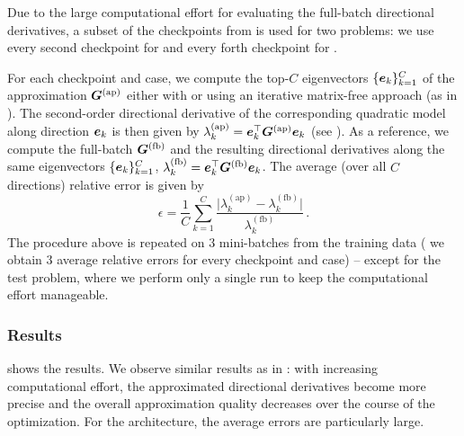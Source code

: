 Due to the large computational effort for evaluating the full-batch directional
derivatives, a subset of the checkpoints from 
is used for two problems: we use every second checkpoint for \cifarten
\resnetthirtytwo and every forth checkpoint for \cifarhun \allcnnc.

For each checkpoint and case, we compute the top-$C$ eigenvectors
$\{{\bm{e}}_k\}_{k=1}^C$ of the \ggn approximation ${\bm{G}}^{(\text{ap})}$ either with
\vivit or using an iterative matrix-free approach (as in
). The second-order directional derivative of the
corresponding quadratic model along direction ${\bm{e}}_k$ is then given by
$\lambda_k^{(\text{ap})} = {\bm{e}}_k^\top {\bm{G}}^{(\text{ap})} {\bm{e}}_k$ (see
). As a reference, we compute the full-batch
\ggn ${\bm{G}}^{(\text{fb})}$ and the resulting directional derivatives along the
same eigenvectors $\{{\bm{e}}_k\}_{k=1}^C$, \ie $\lambda_k^{(\text{fb})} =
{\bm{e}}_k^\top {\bm{G}}^{(\text{fb})} {\bm{e}}_k$. The average (over all $C$ directions)
relative error is given by
\begin{equation*}
  \epsilon = \frac{1}{C} \sum_{k=1}^C \frac{
    \lvert \lambda_k^{(\text{ap})} - \lambda_k^{(\text{fb})} \rvert
  }{\lambda_k^{(\text{fb})}} \, .
\end{equation*}
The procedure above is repeated on $3$ mini-batches from the training data (\ie
we obtain $3$ average relative errors for every checkpoint and case) -- except
for the \cifarhun \allcnnc test problem, where we perform only a single run to
keep the computational effort manageable.

\subsubsection{Results}

 shows the results. We observe similar results
as in : with increasing computational effort,
the approximated directional derivatives become more precise and the overall
approximation quality decreases over the course of the optimization. For the
\resnetthirtytwo architecture, the average errors are particularly large.



